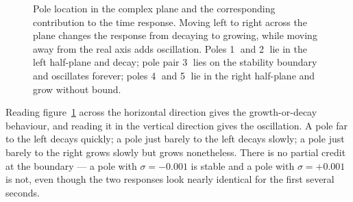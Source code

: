 \documentclass[12pt,letter]{article}
\begin{document}
\begin{figure}[H]
	\caption{Pole location in the complex plane and the corresponding contribution to the time response. Moving left to right across the plane changes the response from decaying to growing, while moving away from the real axis adds oscillation. Poles \textcircled{\scriptsize 1} and \textcircled{\scriptsize 2} lie in the left half-plane and decay; pole pair \textcircled{\scriptsize 3} lies on the stability boundary and oscillates forever; poles \textcircled{\scriptsize 4} and \textcircled{\scriptsize 5} lie in the right half-plane and grow without bound.}
	\label{fig:pole_location_stability}
\end{figure}

Reading figure~\ref{fig:pole_location_stability} across the horizontal direction gives the growth-or-decay behaviour, and reading it in the vertical direction gives the oscillation. A pole far to the left decays quickly; a pole just barely to the left decays slowly; a pole just barely to the right grows slowly but grows nonetheless. There is no partial credit at the boundary --- a pole with $\sigma = -0.001$ is stable and a pole with $\sigma = +0.001$ is not, even though the two responses look nearly identical for the first several seconds.
\end{document}
